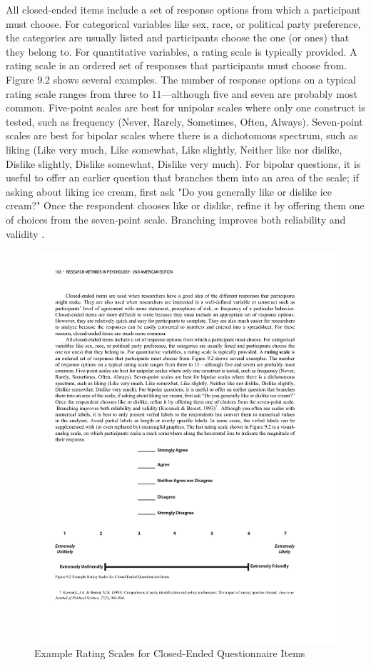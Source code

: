 All closed-ended items include a set of response options from which a participant must choose. For categorical variables like sex, race, or political party preference, the categories are usually listed and participants choose the one (or ones) that they belong to. For quantitative variables, a rating scale is typically provided. A rating scale is an ordered set of responses that participants must choose from. Figure 9.2 shows several examples. The number of response options on a typical rating scale ranges from three to 11---although five and seven are probably most common. Five-point scales are best for unipolar scales where only one construct is tested, such as frequency (Never, Rarely, Sometimes, Often, Always). Seven-point scales are best for bipolar scales where there is a dichotomous spectrum, such as liking (Like very much, Like somewhat, Like slightly, Neither like nor dislike, Dislike slightly, Dislike somewhat, Dislike very much). For bipolar questions, it is useful to offer an earlier question that branches them into an area of the scale; if asking about liking ice cream, first ask "Do you generally like or dislike ice cream?" Once the respondent chooses like or dislike, refine it by offering them one of choices from the seven-point scale. Branching improves both reliability and validity \citep{krosnick_comparisons_1993}.


\begin{figure}


\includegraphics[width=.7\linewidth]{figures/C9scales.pdf}


\caption{Example Rating Scales for Closed-Ended Questionnaire Items}


\label{fig:scales}


\end{figure}


